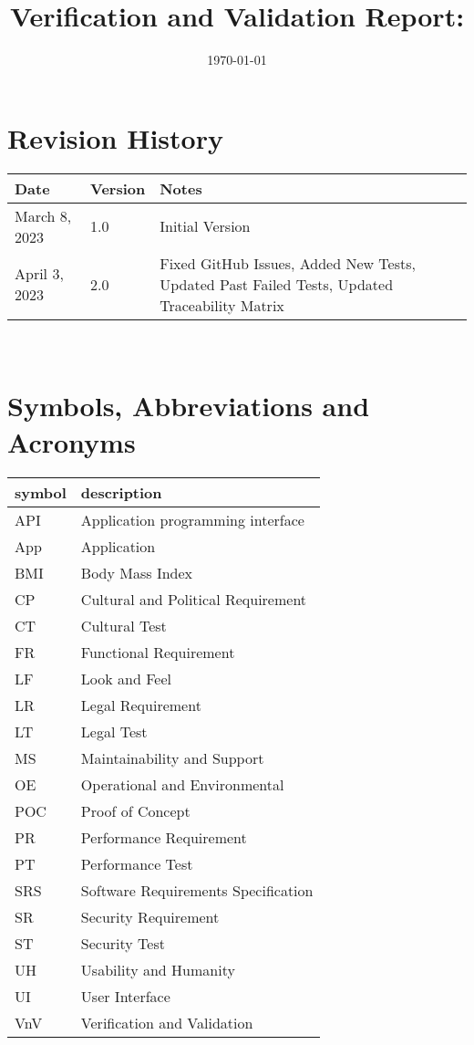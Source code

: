 \documentclass[12pt, titlepage]{article}
\begin{document}
	
	\title{Verification and Validation Report: \progname} 
	\author{\authname}
	\date{\today}
	
	\maketitle
	
	
	\section{Revision History}
	
	\begin{tabularx}{\textwidth}{p{3cm}p{2cm}X}
		\toprule {\bf Date} & {\bf Version} & {\bf Notes}\\
		\midrule
		March 8, 2023 & 1.0 & Initial Version\\
		April 3, 2023 & 2.0 & Fixed GitHub Issues, Added New Tests, Updated Past Failed Tests, Updated Traceability Matrix \\
		\bottomrule
	\end{tabularx}
	
	~\newpage
	
	\section{Symbols, Abbreviations and Acronyms}
	
	\renewcommand{\arraystretch}{1.2}
	\begin{tabular}{l l} 
		\toprule		
		\textbf{symbol} & \textbf{description}\\
		\midrule 
		API & Application programming interface\\
		App & Application\\
		BMI & Body Mass Index\\
		CP & Cultural and Political Requirement\\
		CT & Cultural Test\\
		FR & Functional Requirement\\
		LF & Look and Feel\\
		LR & Legal Requirement\\
		LT & Legal Test\\
		MS & Maintainability and Support\\
		OE & Operational and Environmental\\
		POC & Proof of Concept\\
		PR& Performance Requirement\\
		PT& Performance Test\\
		SRS & Software Requirements Specification\\
		SR & Security Requirement\\
		ST & Security Test\\
		UH & Usability and Humanity\\
		UI & User Interface\\
		VnV & Verification and Validation\\
		\bottomrule
	\end{tabular}\\
	
\end{document}
